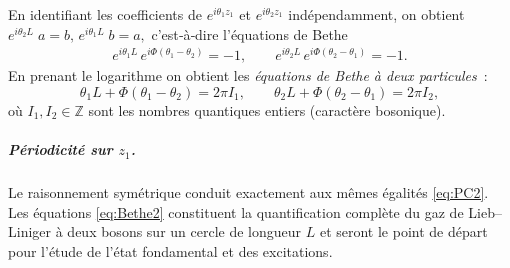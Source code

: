 En identifiant les coefficients de $e^{i\theta_{1}z_{1}}$ et
$e^{i\theta_{2}z_{1}}$ indépendamment, on obtient
\(
	e^{i\theta_{2}L}\;a = b, 
	\,
	e^{i\theta_{1}L}\;b = a,
\)
c’est‑à‑dire l'équations de Bethe
\begin{eqnarray*}\label{eq:PC2}
	e^{i\theta_{1}L}\,e^{i\Phi(\theta_{1}-\theta_{2})} = -1,
	\qquad
	e^{i\theta_{2}L}\,e^{i\Phi(\theta_{2}-\theta_{1})} = -1.	
\end{eqnarray*}
En prenant le logarithme on obtient les \emph{équations de Bethe à deux
particules} :
\begin{equation}\label{eq:Bethe2}
	\theta_{1}L + \Phi(\theta_{1}-\theta_{2}) = 2\pi I_{1}, 
	\qquad
	\theta_{2}L + \Phi(\theta_{2}-\theta_{1}) = 2\pi I_{2},
\end{equation}
où $I_{1},I_{2}\in\mathbb{Z}$ sont les nombres quantiques entiers
(caractère bosonique). 

\subparagraph{Périodicité sur $z_{1}$.}  Le raisonnement symétrique conduit exactement aux mêmes égalités \eqref{eq:PC2}.  
\bigskip
Les équations \eqref{eq:Bethe2} constituent la quantification complète
du gaz de Lieb–Liniger à deux bosons sur un cercle de longueur $L$ et
seront le point de départ pour l’étude de l’état fondamental et des
excitations.



\begin{figure}[H]
	\centering
  \label{}	
\end{figure}




